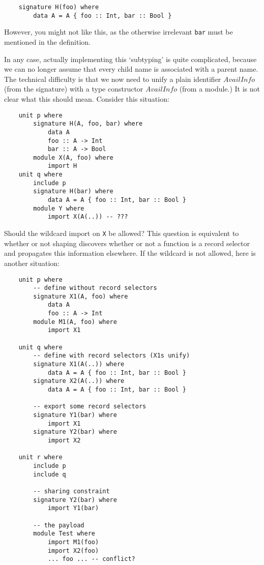 \documentclass{article}
\newcommand{\I}[1]{\ensuremath{\mathit{#1}}}
\begin{document}
\begin{verbatim}
    signature H(foo) where
        data A = A { foo :: Int, bar :: Bool }
\end{verbatim}
%
However, you might not like this, as the otherwise irrelevant \verb|bar| must be mentioned
in the definition.

In any case, actually implementing this `subtyping' is quite complicated, because we can no
longer assume that every child name is associated with a parent name.
The technical difficulty is that we now need to unify a plain identifier
\I{AvailInfo} (from the signature) with a type constructor \I{AvailInfo}
(from a module.)  It is not clear what this should mean.
Consider this situation:

\begin{verbatim}
    unit p where
        signature H(A, foo, bar) where
            data A
            foo :: A -> Int
            bar :: A -> Bool
        module X(A, foo) where
            import H
    unit q where
        include p
        signature H(bar) where
            data A = A { foo :: Int, bar :: Bool }
        module Y where
            import X(A(..)) -- ???
\end{verbatim}

Should the wildcard import on \verb|X| be allowed?
This question is equivalent to whether or not shaping discovers
whether or not a function is a record selector and propagates this
information elsewhere.
If the wildcard is not allowed, here is another situation:

\begin{verbatim}
    unit p where
        -- define without record selectors
        signature X1(A, foo) where
            data A
            foo :: A -> Int
        module M1(A, foo) where
            import X1

    unit q where
        -- define with record selectors (X1s unify)
        signature X1(A(..)) where
            data A = A { foo :: Int, bar :: Bool }
        signature X2(A(..)) where
            data A = A { foo :: Int, bar :: Bool }

        -- export some record selectors
        signature Y1(bar) where
            import X1
        signature Y2(bar) where
            import X2

    unit r where
        include p
        include q

        -- sharing constraint
        signature Y2(bar) where
            import Y1(bar)

        -- the payload
        module Test where
            import M1(foo)
            import X2(foo)
            ... foo ... -- conflict?
\end{verbatim}
\end{document}
